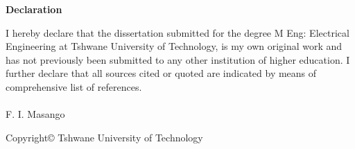 
{\large \textbf{Declaration\newline}}


I hereby declare that the dissertation submitted for the degree M Eng: Electrical Engineering at Tshwane University of Technology, is my own original work and has not previously been submitted to any other institution of higher education. I further declare that all sources cited or quoted are indicated by means of comprehensive list of references.\\\\

F. I. Masango
\vfill

Copyright© Tshwane University of Technology

	
